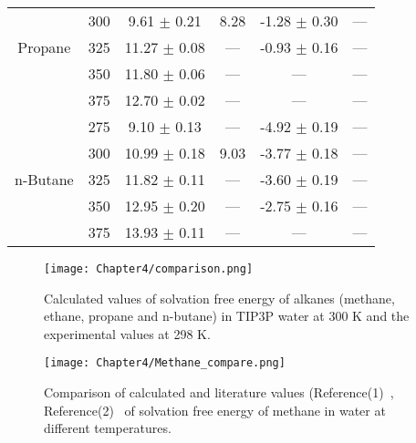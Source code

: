 \begin{table}[H]
{\begin{tabular}{ |c| c| c | c | c  | c |  }
  & 300 &	  9.61 $\pm$ 0.21 & 8.28  &  -1.28 $\pm$ 0.30 & ---  \\
  Propane  &  325 &	 11.27 $\pm$ 0.08 & ---  & -0.93 $\pm$ 0.16 & ---\\  
  & 350 &	  11.80 $\pm$ 0.06 & ---  &   --- & --- \\ 
  & 375 &	   12.70  $\pm$ 0.02 & --- &   --- & --- \\ \hline  
  & 275 &	  9.10 $\pm$ 0.13 & ---  &  -4.92 $\pm$ 0.19 & ---  \\ 
  & 300 &	  10.99 $\pm$ 0.18 & 9.03  &  -3.77 $\pm$ 0.18 & ---  \\
 n-Butane  &  325 &  11.82 $\pm$ 0.11  &---  &  -3.60 $\pm$ 0.19 & ---\\  
  & 350 &	  12.95 $\pm$ 0.20 & ---  &   -2.75 $\pm$ 0.16 & --- \\ 
  & 375 &	   13.93 $\pm$ 0.11 & --- &   --- & --- \\   
 \hline  
\end{tabular}}
\end{table}

\begin{figure}[h!]
 \centering
\texttt{[image: Chapter4/comparison.png]}
\caption[Solvation free energy of light alkanes in TIP3P water.] { Calculated values of solvation free energy of alkanes (methane, ethane, propane and n-butane) in TIP3P water at 300 K and the experimental values at 298 K.}
\label{alkanecompare}
\end{figure}
 
 
 \begin{figure}[h!]
  \centering
 \texttt{[image: Chapter4/Methane\_compare.png]}
  \caption[Comparison of calculated and literature values of free energy of solvation of methane in water at different temperatures. ]{ Comparison of calculated and literature values (Reference(1)~\citep{paschek2004temperature, fernandez2004aqueous}, Reference(2)~\citep{docherty2006potential} of solvation free energy of methane in water at different temperatures.}
  \label{methanecompare} 
  \end{figure}
  
